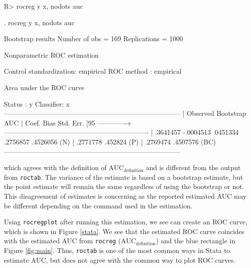 \documentclass[article]{jss}
\begin{document}
\begin{CodeChunk}

\begin{CodeInput}
R> rocreg y x, nodots auc
\end{CodeInput}


\begin{CodeOutput}
 . rocreg y x, nodots auc

Bootstrap results                               Number of obs      =       169
                                                Replications       =      1000

Nonparametric ROC estimation

Control standardization: empirical
ROC method             : empirical

Area under the ROC curve

   Status    : y
   Classifier: x
------------------------------------------------------------------------------
             |    Observed               Bootstrap
         AUC |       Coef.       Bias    Std. Err.     [95%
-------------+----------------------------------------------------------------
             |    .3641457  -.0004513    .0451334     .2756857   .4526056  (N)
             |                                        .2771778    .452824  (P)
             |                                        .2769474   .4507576 (BC)
------------------------------------------------------------------------------
\end{CodeOutput}
\end{CodeChunk}

which agrees with the definition of \(\text{AUC}_{\text{definition}}\)
and is different from the output from \texttt{roctab}. The variance of
the estimate is based on a bootstrap estimate, but the point estimate
will remain the same regardless of using the bootstrap or not. This
disagreement of estimates is concerning as the reported estimated AUC
may be different depending on the command used in the estimation.

Using \texttt{rocregplot} after running this estimation, we see can
create an ROC curve, which is shown in Figure \ref{stata}. We see that
the estimated ROC curve coincides with the estimated AUC from
\texttt{rocreg} (\(\text{AUC}_{\text{definition}}\)) and the blue
rectangle in Figure \ref{fig:main}. Thus, \texttt{roctab} is one of the
most common ways in Stata to estimate AUC, but does not agree with the
common way to plot ROC curves.
\end{document}
